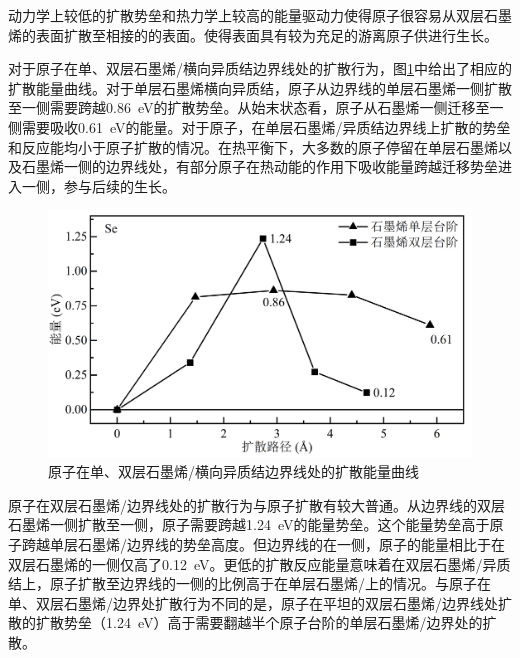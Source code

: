     动力学上较低的扩散势垒和热力学上较高的能量驱动力使得原子很容易从双层石墨烯的表面扩散至相接的的表面。使得表面具有较为充足的游离原子供进行生长。

    对于原子在单、双层石墨烯/横向异质结边界线处的扩散行为，图\ref{fig:VS_DFT_NEB_Se_GtVSe}中给出了相应的扩散能量曲线。对于单层石墨烯横向异质结，原子从边界线的单层石墨烯一侧扩散至一侧需要跨越\SI{0.86}{\electronvolt}的扩散势垒。从始末状态看，原子从石墨烯一侧迁移至一侧需要吸收\SI{0.61}{\electronvolt}的能量。对于原子，在单层石墨烯/异质结边界线上扩散的势垒和反应能均小于原子扩散的情况。在热平衡下，大多数的原子停留在单层石墨烯以及石墨烯一侧的边界线处，有部分原子在热动能的作用下吸收能量跨越迁移势垒进入一侧，参与后续的生长。
    
    \begin{figure}[htb]
        \includegraphics{pic/VS_DFT_NEB_Se_GtVSe.png}
        \caption{原子在单、双层石墨烯/横向异质结边界线处的扩散能量曲线}
        \label{fig:VS_DFT_NEB_Se_GtVSe}
    \end{figure}

    原子在双层石墨烯/边界线处的扩散行为与原子扩散有较大普通。从边界线的双层石墨烯一侧扩散至一侧，原子需要跨越\SI{1.24}{\electronvolt}的能量势垒。这个能量势垒高于原子跨越单层石墨烯/边界线的势垒高度。但边界线的在一侧，原子的能量相比于在双层石墨烯的一侧仅高了\SI{0.12}{\electronvolt}。更低的扩散反应能量意味着在双层石墨烯/异质结上，原子扩散至边界线的一侧的比例高于在单层石墨烯/上的情况。与原子在单、双层石墨烯/边界处扩散行为不同的是，原子在平坦的双层石墨烯/边界线处扩散的扩散势垒（\SI{1.24}{\electronvolt}）高于需要翻越半个原子台阶的单层石墨烯/边界处的扩散。
    
